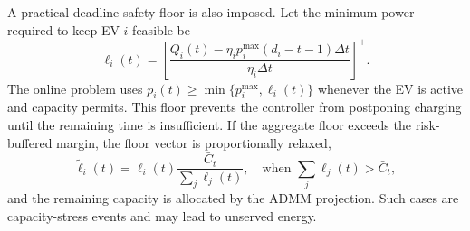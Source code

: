 \documentclass[journal]{IEEEtran}
\begin{document}
A practical deadline safety floor is also imposed. Let the minimum power required to keep EV $i$ feasible be
\begin{equation}
\ell_i(t)=
\left[
\frac{Q_i(t)-\eta_i p_i^{\max}(d_i-t-1)\Delta t}
{\eta_i\Delta t}
\right]^+ .
\label{eq:deadline_floor}
\end{equation}
The online problem uses $p_i(t)\ge \min\{p_i^{\max},\ell_i(t)\}$ whenever the EV is active and capacity permits. This floor prevents the controller from postponing charging until the remaining time is insufficient. If the aggregate floor exceeds the risk-buffered margin, the floor vector is proportionally relaxed,
\begin{equation}
\tilde\ell_i(t)=\ell_i(t)\frac{\bar C_t}{\sum_j\ell_j(t)} ,
\quad \text{when } \sum_j\ell_j(t)>\bar C_t ,
\label{eq:floor_relax}
\end{equation}
and the remaining capacity is allocated by the ADMM projection. Such cases are capacity-stress events and may lead to unserved energy.
\end{document}

